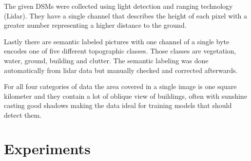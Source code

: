 The given DSMs were collected using light detection and ranging technology (Lidar). 
They have a single channel that describes the height of each pixel with a greater number 
representing a higher distance to the ground. 

Lastly there are semantic labeled pictures with one channel of a single byte encodes one of five 
different topographic classes. Those classes are vegetation, water, ground, building and clutter. 
The semantic labeling was done automatically from lidar data but manually checked and corrected afterwards.

For all four categories of data the area covered in a single image
is one square kilometer and they contain a lot of oblique view of 
buildings, often with sunshine casting good shadows making the 
data ideal for training models that should detect them.

\section{Experiments}

